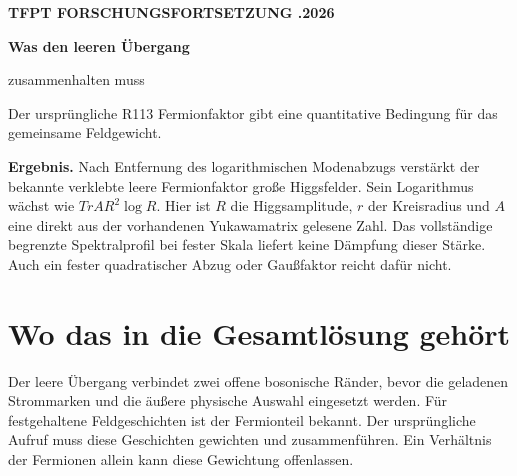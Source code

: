 \documentclass[11pt,a4paper]{article}
\newcommand{\panel}[1]{\noindent\colorbox{pale}{\parbox{\dimexpr\linewidth-2\fboxsep}{\vspace{4pt}\color{ink}#1\vspace{4pt}}}}
\begin{document}
\color{ink}
{\small\bfseries\color{sea} TFPT \quad FORSCHUNGSFORTSETZUNG .2026}

{\Huge\bfseries Was den leeren Übergang\par zusammenhalten muss\par}
\vspace{2mm}
{\large Der ursprüngliche R113 Fermionfaktor gibt eine quantitative Bedingung für das gemeinsame Feldgewicht.}

\panel{\textbf{Ergebnis.} Nach Entfernung des logarithmischen Modenabzugs verstärkt der bekannte verklebte leere Fermionfaktor große Higgsfelder. Sein Logarithmus wächst wie \(T r A R^2\log R\). Hier ist \(R\) die Higgsamplitude, \(r\) der Kreisradius und \(A\) eine direkt aus der vorhandenen Yukawamatrix gelesene Zahl. Das vollständige begrenzte Spektralprofil bei fester Skala liefert keine Dämpfung dieser Stärke. Auch ein fester quadratischer Abzug oder Gaußfaktor reicht dafür nicht.}

\section*{Wo das in die Gesamtlösung gehört}

Der leere Übergang verbindet zwei offene bosonische Ränder, bevor die geladenen Strommarken und die äußere physische Auswahl eingesetzt werden. Für festgehaltene Feldgeschichten ist der Fermionteil bekannt. Der ursprüngliche Aufruf muss diese Geschichten gewichten und zusammenführen. Ein Verhältnis der Fermionen allein kann diese Gewichtung offenlassen.

\begin{center}
\end{center}
\end{document}
